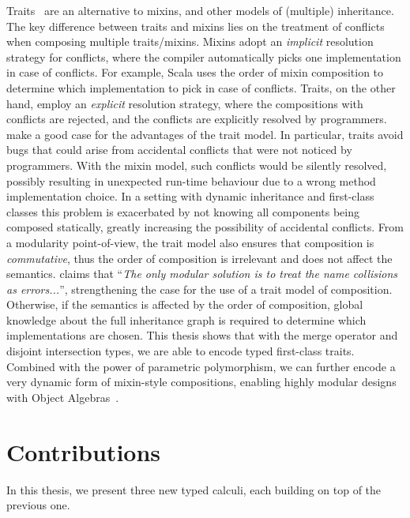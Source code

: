 Traits~\citep{scharli2003traits, Ducasse_2006} are an alternative to mixins, and
other models of (multiple) inheritance. The key difference between traits and
mixins lies on the treatment of conflicts when composing multiple traits/mixins.
Mixins adopt an \emph{implicit} resolution strategy for conflicts, where the
compiler automatically picks one implementation in case of conflicts. For
example, Scala uses the order of mixin composition to determine which
implementation to pick in case of conflicts. Traits, on the other hand, employ
an \emph{explicit} resolution strategy, where the compositions with conflicts
are rejected, and the conflicts are explicitly resolved by programmers.
\citet{scharli2003traits} make a good case for the advantages of the trait
model. In particular, traits avoid bugs that could arise from accidental
conflicts that were not noticed by programmers. With the mixin model, such
conflicts would be silently resolved, possibly resulting in unexpected run-time
behaviour due to a wrong method implementation choice. In a setting with dynamic
inheritance and first-class classes this problem is exacerbated by not knowing
all components being composed statically, greatly increasing the possibility of
accidental conflicts. From a modularity point-of-view, the trait model also
ensures that composition is \emph{commutative}, thus the order of composition is
irrelevant and does not affect the semantics. \citet{bracha1992programming}
claims that ``\emph{The only modular solution is to treat the name collisions as
  errors...}'', strengthening the case for the use of a trait model of
composition. Otherwise, if the semantics is affected by the order of
composition, global knowledge about the full inheritance graph is required to
determine which implementations are chosen. %
This thesis shows that with the merge operator
and disjoint intersection types, we are able to encode typed first-class traits.
Combined with the power of parametric polymorphism, we can further encode a very
dynamic form of mixin-style compositions, enabling highly modular designs with
Object Algebras~\citep{oliveira2012extensibility}.


\section{Contributions}

In this thesis, we present three new typed calculi, each building on top of the previous one.

